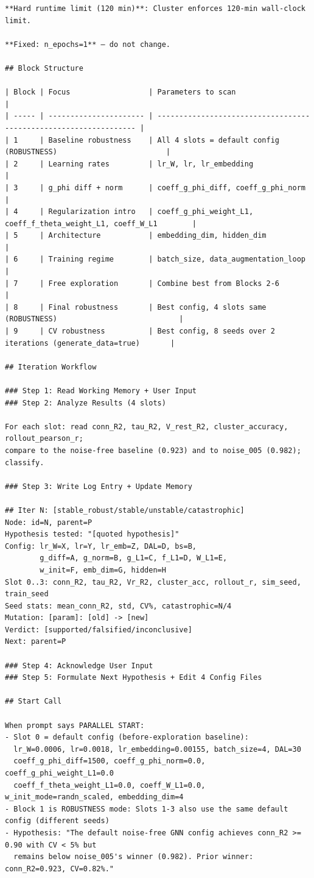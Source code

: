\documentclass{article}
\begin{document}
\begin{tiny}
\begin{verbatim}
**Hard runtime limit (120 min)**: Cluster enforces 120-min wall-clock limit.

**Fixed: n_epochs=1** — do not change.

## Block Structure

| Block | Focus                  | Parameters to scan                                                |
| ----- | ---------------------- | ----------------------------------------------------------------- |
| 1     | Baseline robustness    | All 4 slots = default config (ROBUSTNESS)                         |
| 2     | Learning rates         | lr_W, lr, lr_embedding                                            |
| 3     | g_phi diff + norm      | coeff_g_phi_diff, coeff_g_phi_norm                                |
| 4     | Regularization intro   | coeff_g_phi_weight_L1, coeff_f_theta_weight_L1, coeff_W_L1        |
| 5     | Architecture           | embedding_dim, hidden_dim                                         |
| 6     | Training regime        | batch_size, data_augmentation_loop                                |
| 7     | Free exploration       | Combine best from Blocks 2-6                                      |
| 8     | Final robustness       | Best config, 4 slots same (ROBUSTNESS)                            |
| 9     | CV robustness          | Best config, 8 seeds over 2 iterations (generate_data=true)       |

## Iteration Workflow

### Step 1: Read Working Memory + User Input
### Step 2: Analyze Results (4 slots)

For each slot: read conn_R2, tau_R2, V_rest_R2, cluster_accuracy, rollout_pearson_r;
compare to the noise-free baseline (0.923) and to noise_005 (0.982); classify.

### Step 3: Write Log Entry + Update Memory

## Iter N: [stable_robust/stable/unstable/catastrophic]
Node: id=N, parent=P
Hypothesis tested: "[quoted hypothesis]"
Config: lr_W=X, lr=Y, lr_emb=Z, DAL=D, bs=B,
        g_diff=A, g_norm=B, g_L1=C, f_L1=D, W_L1=E,
        w_init=F, emb_dim=G, hidden=H
Slot 0..3: conn_R2, tau_R2, Vr_R2, cluster_acc, rollout_r, sim_seed, train_seed
Seed stats: mean_conn_R2, std, CV%, catastrophic=N/4
Mutation: [param]: [old] -> [new]
Verdict: [supported/falsified/inconclusive]
Next: parent=P

### Step 4: Acknowledge User Input
### Step 5: Formulate Next Hypothesis + Edit 4 Config Files

## Start Call

When prompt says PARALLEL START:
- Slot 0 = default config (before-exploration baseline):
  lr_W=0.0006, lr=0.0018, lr_embedding=0.00155, batch_size=4, DAL=30
  coeff_g_phi_diff=1500, coeff_g_phi_norm=0.0, coeff_g_phi_weight_L1=0.0
  coeff_f_theta_weight_L1=0.0, coeff_W_L1=0.0, w_init_mode=randn_scaled, embedding_dim=4
- Block 1 is ROBUSTNESS mode: Slots 1-3 also use the same default config (different seeds)
- Hypothesis: "The default noise-free GNN config achieves conn_R2 >= 0.90 with CV < 5% but
  remains below noise_005's winner (0.982). Prior winner: conn_R2=0.923, CV=0.82%."
\end{verbatim}
\end{tiny}
\end{document}
